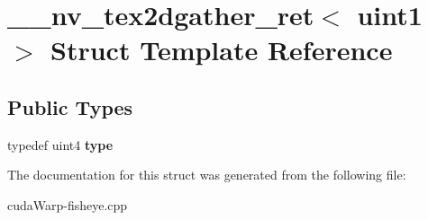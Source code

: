 \hypertarget{struct____nv__tex2dgather__ret_3_01uint1_01_4}{}\section{\+\_\+\+\_\+nv\+\_\+tex2dgather\+\_\+ret$<$ uint1 $>$ Struct Template Reference}
\label{struct____nv__tex2dgather__ret_3_01uint1_01_4}
\subsection*{Public Types}
\begin{DoxyCompactItemize}
\item 
typedef uint4 {\bfseries type}\hypertarget{struct____nv__tex2dgather__ret_3_01uint1_01_4_adc90227328cea02c5fd594626da6d9eb}{}\label{struct____nv__tex2dgather__ret_3_01uint1_01_4_adc90227328cea02c5fd594626da6d9eb}

\end{DoxyCompactItemize}


The documentation for this struct was generated from the following file\+:\begin{DoxyCompactItemize}
\item 
cuda\+Warp-\/fisheye.\+cpp\end{DoxyCompactItemize}

